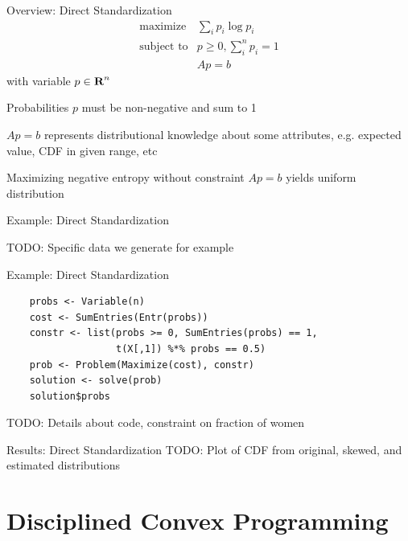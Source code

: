 \documentclass{beamer}
\begin{document}
\begin{frame}{Overview: Direct Standardization}
	\[
	\begin{array}{ll} \mbox{maximize} & \sum_i p_i \log p_i \\
	\mbox{subject to} & p \geq 0, \sum_i^n p_i = 1\\
	& Ap = b
	\end{array}
	\]
	with variable $p \in {\mbox{\bf R}}^n$
	
	\BIT
	\item Probabilities $p$ must be non-negative and sum to 1
	\item $Ap = b$ represents distributional knowledge about some attributes, e.g. expected value, CDF in given range, etc
	\item Maximizing negative entropy without constraint $Ap = b$ yields uniform distribution
	\EIT
\end{frame}

\begin{frame}{Example: Direct Standardization}
	\BIT
	\item TODO: Specific data we generate for example
	\EIT
\end{frame}

\begin{frame}[fragile]{Example: Direct Standardization}
	\begin{verbatim}
	probs <- Variable(n)
	cost <- SumEntries(Entr(probs))
	constr <- list(probs >= 0, SumEntries(probs) == 1, 
				   t(X[,1]) %*% probs == 0.5)
	prob <- Problem(Maximize(cost), constr)
	solution <- solve(prob)
	solution$probs
	\end{verbatim}
	
	\BIT
		\item TODO: Details about code, constraint on fraction of women
	\EIT
\end{frame}

\begin{frame}{Results: Direct Standardization}
	TODO: Plot of CDF from original, skewed, and estimated distributions
\end{frame}

\section{Disciplined Convex Programming}
\end{document}
